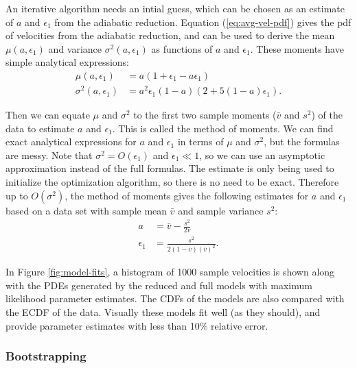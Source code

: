 An iterative algorithm needs an intial guess, which can be chosen as
an estimate of $a$ and $\epsilon_1$ from the adiabatic
reduction. Equation (\ref{eq:avg-vel-pdf}) gives the pdf of velocities
from the adiabatic reduction, and can be used to derive the mean
$\mu(a, \epsilon_1)$ and variance $\sigma^2(a, \epsilon_1)$ as
functions of $a$ and $\epsilon_1$. These moments have simple
analytical expressions:
\begin{align}
  \label{eq:mean-ar}
  \mu(a, \epsilon_1) &= a(1 + \epsilon_1 - a \epsilon_1) \\
  \label{eq:var-ar}
  \sigma^2(a, \epsilon_1) &= a^2 \epsilon_1 (1 - a) (2 + 5(1 - a) \epsilon_1).
\end{align}

Then we can equate $\mu$ and $\sigma^2$ to the first two sample
moments ($\bar{v}$ and $s^2$) of the data to estimate $a$ and
$\epsilon_1$. This is called the method of moments. We can find exact
analytical expressions for $a$ and $\epsilon_1$ in terms of $\mu$ and
$\sigma^2$, but the formulas are messy. Note that
$\sigma^2 = O(\epsilon_1)$ and $\epsilon_1 \ll 1$, so we can use an
asymptotic approximation instead of the full formulas. The estimate is
only being used to initialize the optimization algorithm, so there is
no need to be exact. Therefore up to $O(\sigma^2)$, the method of
moments gives the following estimates for $a$ and $\epsilon_1$ based on
a data set with sample mean $\bar{v}$ and sample variance $s^2$:
\begin{align}
  \label{eq:mean-est}
  a &= \bar{v} - \frac{s^2}{2\bar{v}} \\
  \label{eq:var-est}
  \epsilon_1 &= \frac{s^2}{2(1 - \bar{v})(\bar{v})^2}.
\end{align}

In Figure \ref{fig:model-fits}, a histogram of 1000 sample velocities
is shown along with the PDEs generated by the reduced and full models
with maximum likelihood parameter estimates. The CDFs of the models
are also compared with the ECDF of the data. Visually these models fit
well (as they should), and provide parameter estimates with less than
10\% relative error.

\subsubsection{Bootstrapping}
\label{sec:bootstrapping}

